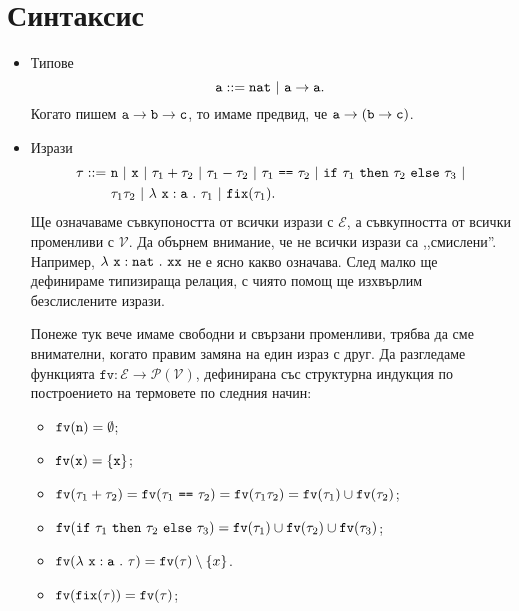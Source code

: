 \section{Синтаксис}

\newcommand{\rename}[2]{\{\vv{#1}/{#2}\}}

\newcommand{\var}{\texttt{var}}
\newcommand{\fv}{\texttt{fv}}

\begin{itemize}
\item{}
  Типове
  \[\vv{a} ::= \vv{nat}\ |\ \vv{a} \to \vv{a}.\]
  Когато пишем 
  $\texttt{a} \to \texttt{b} \to \texttt{c}$, то имаме предвид, че
  $\texttt{a} \to (\texttt{b} \to \texttt{c})$.
\item{}
  Изрази
  \begin{align*}
    \tau ::=\ & \vv{n}\ |\ \vv{x}\ |\ \tau_1 + \tau_2\ |\ \tau_1 - \tau_2\ |\  \tau_1\ \vv{==}\ \tau_2\ |\ \ifelse{\tau_1}{\tau_2}{\tau_3}\ |\\
              & \tau_1\tau_2\ |\ \lamb{x}{a}{\tau_1}\ |\ \fix(\tau_1).
  \end{align*}
  Ще означаваме съвкупоността от всички изрази с $\mathcal{E}$, а съвкупността от всички променливи с $\mathcal{V}$.
  Да обърнем внимание, че не всички изрази са ,,смислени''. Например,
  $\lambda~\texttt{x}:\texttt{nat}~.~{\texttt{xx}}$ не е ясно какво означава.
  След малко ще дефинираме типизираща релация, с чиято помощ ще изхвърлим безслислените изрази.
  
  Понеже тук вече имаме свободни и свързани променливи, трябва да сме внимателни, когато правим замяна на един израз с друг. Да разгледаме функцията $\fv:\mathcal{E} \to \mathcal{P}(\mathcal{V})$, дефинирана със структурна индукция по построението на термовете по следния начин:
  
  \begin{itemize}
  \item
    $\fv(\vv{n}) = \emptyset$;
  \item
    $\fv(\vv{x}) = \{\vv{x}\}$;
  \item
    $\fv(\tau_1 + \tau_2) = \fv(\tau_1\ \vv{==}\ \tau_2) = \fv(\tau_1\tau_2) = \fv(\tau_1) \cup \fv(\tau_2)$;
  \item
    $\fv(\ifelse{\tau_1}{\tau_2}{\tau_3}) = \fv(\tau_1) \cup \fv(\tau_2) \cup \fv(\tau_3)$;
  \item
    $\fv(\lamb{x}{a}{\tau}) = \fv(\tau) \setminus \{x\}$.
  \item
    $\fv(\fix(\tau)) = \fv(\tau)$;
  \end{itemize}
  

\end{itemize}
